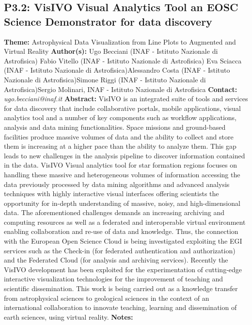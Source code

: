 \documentclass{report}
\begin{document}
{{{{{{{{{{{{{{{\subsection*{P3.2: VisIVO Visual Analytics Tool an EOSC Science Demonstrator for data discovery}
{\bf Theme:}  Astrophysical Data Visualization from Line Plots to Augmented and Virtual Reality\newline
{\bf Author(s):}\newline
Ugo Becciani (INAF - Istituto Nazionale di Astrofisica) \newline Fabio Vitello (INAF - Istituto Nazionale di Astrofisica) \newline  Eva Sciacca (INAF - Istituto Nazionale di Astrofisica)\newline  Alessandro Costa (INAF - Istituto Nazionale di Astrofisica)\newline Simone Riggi (INAF - Istituto Nazionale di Astrofisica)\newline  Sergio Molinari, INAF - Istituto Nazionale di Astrofisica\newline\newline
{\bf Contact:} {\it ugo.becciani@inaf.it}\newline
\newline\newline
{\bf Abstract:}\newline
VisIVO is an integrated suite of tools and services for data discovery that include collaborative portals, mobile applications, visual analytics tool and a number of key components such as workflow applications, analysis and data mining functionalities. Space missions and ground-based facilities produce massive volumes of data and the ability to collect and store them is increasing at a higher pace than the ability to analyze them. This gap leads to new challenges in the analysis pipeline to discover information contained in the data. VisIVO Visual analytics tool for star formation regions focuses on handling these massive and heterogeneous volumes of information accessing the data previously processed by data mining algorithms and advanced analysis techniques with highly interactive visual interfaces offering scientists the opportunity for in-depth understanding of massive, noisy, and high-dimensional data. The aforementioned challenges demands an increasing archiving and computing resources as well as a federated and interoperable virtual environment enabling collaboration and re-use of data and knowledge. Thus, the connection with the European Open Science Cloud is being investigated exploiting the EGI services such as the Check-in (for federated authentication and authorization) and the Federated Cloud (for analysis and archiving services). Recently the VisIVO development has been exploited for the experimentation of cutting-edge interactive visualization technologies for the improvement of teaching and scientific dissemination. This work is being carried out as a knowledge transfer from astrophysical sciences to geological sciences in the context of an international collaboration to innovate teaching, learning and dissemination of earth sciences, using virtual reality.\newline
{\bf Notes:}\newline
{\newpage
}}}}}}}}}}}}}}}}
\end{document}
